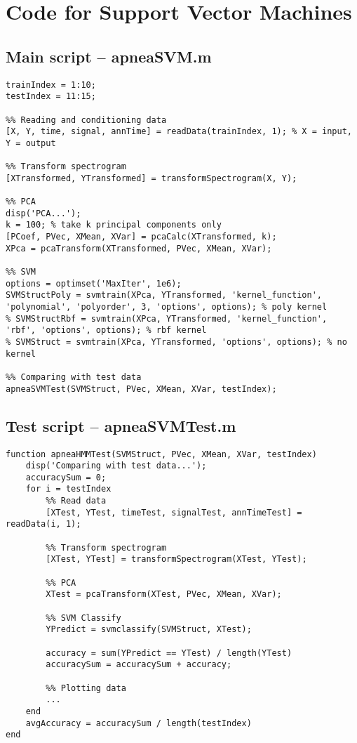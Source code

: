 \chapter{Code for Support Vector Machines}
\section{Main script -- apneaSVM.m}
\label{sec:apneaSVM}
\begin{lstlisting}
trainIndex = 1:10;
testIndex = 11:15;

%% Reading and conditioning data
[X, Y, time, signal, annTime] = readData(trainIndex, 1); % X = input, Y = output

%% Transform spectrogram
[XTransformed, YTransformed] = transformSpectrogram(X, Y);

%% PCA
disp('PCA...');
k = 100; % take k principal components only
[PCoef, PVec, XMean, XVar] = pcaCalc(XTransformed, k);
XPca = pcaTransform(XTransformed, PVec, XMean, XVar);

%% SVM
options = optimset('MaxIter', 1e6);
SVMStructPoly = svmtrain(XPca, YTransformed, 'kernel_function', 'polynomial', 'polyorder', 3, 'options', options); % poly kernel
% SVMStructRbf = svmtrain(XPca, YTransformed, 'kernel_function', 'rbf', 'options', options); % rbf kernel
% SVMStruct = svmtrain(XPca, YTransformed, 'options', options); % no kernel

%% Comparing with test data
apneaSVMTest(SVMStruct, PVec, XMean, XVar, testIndex);
\end{lstlisting}

\section{Test script -- apneaSVMTest.m}
\label{sec:apneaSVMTest}
\begin{lstlisting}
function apneaHMMTest(SVMStruct, PVec, XMean, XVar, testIndex)
    disp('Comparing with test data...');
    accuracySum = 0;
    for i = testIndex
        %% Read data
        [XTest, YTest, timeTest, signalTest, annTimeTest] = readData(i, 1);
        
        %% Transform spectrogram
        [XTest, YTest] = transformSpectrogram(XTest, YTest);
        
        %% PCA
        XTest = pcaTransform(XTest, PVec, XMean, XVar);

        %% SVM Classify
        YPredict = svmclassify(SVMStruct, XTest);
        
        accuracy = sum(YPredict == YTest) / length(YTest)
        accuracySum = accuracySum + accuracy;
        
        %% Plotting data
        ...
    end
    avgAccuracy = accuracySum / length(testIndex)
end
\end{lstlisting}